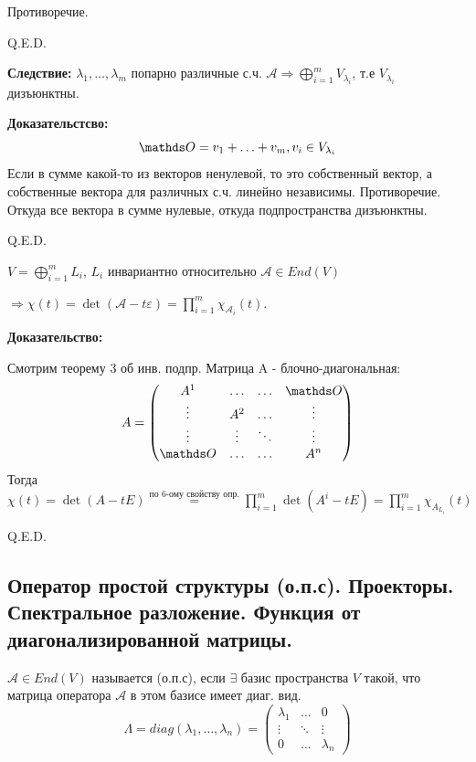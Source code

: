 Противоречие.

\hfill Q.E.D.

\textbf{Следствие:} $\lambda_1, \ldots,\lambda_m$ попарно различные с.ч. $\mathcal{A} \Rightarrow \bigoplus\limits_{i=1}^m V_{\lambda_i}$, т.е $V_{\lambda_i}$ дизъюнктны.

\textbf{Доказательстсво:}
$$\zero = v_1 + \ldots+ v_m, v_i \in V_{\lambda_i}$$
Если в сумме какой-то из векторов ненулевой, то это собственный вектор, а собственные вектора для различных с.ч. линейно независимы. Противоречие. Откуда все вектора в сумме нулевые, откуда подпространства дизъюнктны.

\hfill Q.E.D.


$V = \bigoplus\limits_{i=1}^mL_i$, $L_i$ инвариантно относительно $\mathcal{A} \in End(V)$

$\Rightarrow \chi(t) = \det(\mathcal{A} - t\varepsilon) = \prod\limits_{i=1}^m\chi_{\mathcal{A}_i}(t) $.

\textbf{Доказательство:}

Смотрим теорему 3 об инв. подпр. Матрица A - блочно-диагональная:
$$A = \begin{pmatrix}
    A^1 &\ldots&\ldots& \zero\\
    \vdots &A^2&\ldots& \vdots\\
    \vdots  & \vdots &\ddots& \vdots\\
    \zero & \ldots &\ldots& A^n
\end{pmatrix}$$
  Тогда $\chi(t) = \det(A-tE) \overset{\text{по 6-ому свойству опр.}}= \prod\limits_{i=1}^m \det(A^i-tE) = \prod\limits_{i=1}^m \chi_{A_{L_i}}(t) $

\hfill Q.E.D.


\subsection{Оператор простой структуры (о.п.с). Проекторы. Спектральное разложение. Функция от диагонализированной матрицы.}

$\mathcal{A} \in End(V)$ называется  (о.п.с), если $\exists$ базис пространства $V$ такой, что матрица оператора $\mathcal{A}$ в этом базисе имеет диаг. вид.
$$\Lambda = diag(\lambda_1,\ldots,\lambda_n)=\begin{pmatrix}
    \lambda_1 & \ldots & 0 \\
    \vdots & \ddots & \vdots\\
    0 & \ldots &\lambda_n
\end{pmatrix}$$

